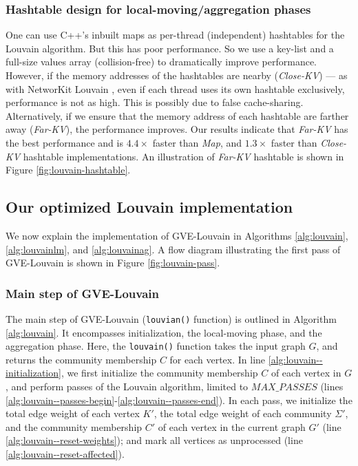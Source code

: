 \subsubsection{Hashtable design for local-moving/aggregation phases}

One can use C++'s inbuilt maps as per-thread (independent) hashtables for the Louvain algorithm. But this has poor performance. So we use a key-list and a full-size values array (collision-free) to dramatically improve performance. However, if the memory addresses of the hashtables are nearby (\textit{Close-KV}) --- as with NetworKit Louvain \cite{staudt2016networkit}, even if each thread uses its own hashtable exclusively, performance is not as high. This is possibly due to false cache-sharing. Alternatively, if we ensure that the memory address of each hashtable are farther away (\textit{Far-KV}), the performance improves. Our results indicate that \textit{Far-KV} has the best performance and is $4.4\times$ faster than \textit{Map}, and $1.3\times$ faster than \textit{Close-KV} hashtable implementations. An illustration of \textit{Far-KV} hashtable is shown in Figure \ref{fig:louvain-hashtable}.







\subsection{Our optimized Louvain implementation}

We now explain the implementation of GVE-Louvain in Algorithms \ref{alg:louvain}, \ref{alg:louvainlm}, and \ref{alg:louvainag}. A flow diagram illustrating the first pass of GVE-Louvain is shown in Figure \ref{fig:louvain-pass}.


\subsubsection{Main step of GVE-Louvain}

The main step of GVE-Louvain (\texttt{louvian()} function) is outlined in Algorithm \ref{alg:louvain}. It encompasses initialization, the local-moving phase, and the aggregation phase. Here, the \texttt{louvain()} function takes the input graph $G$, and returns the community membership $C$ for each vertex. In line \ref{alg:louvain--initialization}, we first initialize the community membership $C$ of each vertex in $G$, and perform passes of the Louvain algorithm, limited to $MAX\_PASSES$ (lines \ref{alg:louvain--passes-begin}-\ref{alg:louvain--passes-end}). In each pass, we initialize the total edge weight of each vertex $K'$, the total edge weight of each community $\Sigma'$, and the community membership $C'$ of each vertex in the current graph $G'$ (line \ref{alg:louvain--reset-weights}); and mark all vertices as unprocessed (line \ref{alg:louvain--reset-affected}).

